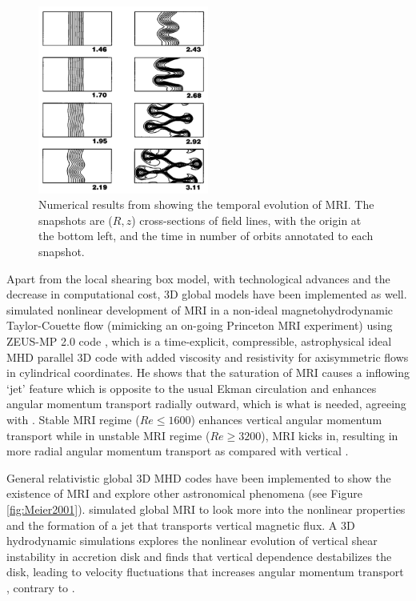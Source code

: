 \documentclass{jfm}
\begin{document}
\begin{figure}
    \centering
    \includegraphics[width=0.50\textwidth]{Balbus1998}
    \caption{Numerical results from \cite{Balbus1998} showing the temporal evolution of MRI. The snapshots are ($R, z$) cross-sections of field lines, with the origin at the bottom left, and the time in number of orbits annotated to each snapshot.}
    \label{fig:Balbus1998}
\end{figure}

Apart from the local shearing box model, with technological advances and the
decrease in computational cost, 3D global models have been implemented as well.
\cite{Liu2008} simulated nonlinear development of MRI in a non-ideal
magnetohydrodynamic Taylor-Couette flow (mimicking an on-going Princeton MRI
experiment) using ZEUS-MP 2.0 code \citep{Hayes2006}, which is a time-explicit,
compressible, astrophysical ideal MHD parallel 3D code with added viscosity and
resistivity for axisymmetric flows in cylindrical coordinates. He shows that
the saturation of MRI causes a inflowing `jet' feature which is opposite to the
usual Ekman circulation and enhances angular momentum transport radially
outward, which is what is needed, agreeing with \cite{Hawley1995}. Stable MRI
regime ($ Re \le 1600$) enhances vertical angular momentum transport while in
unstable MRI regime ($Re \ge 3200$), MRI kicks in, resulting in more radial
angular momentum transport as compared with vertical \citep{Liu2008}.

General relativistic global 3D MHD codes have been implemented to show the
existence of MRI and explore other astronomical phenomena 
\citep{Meier2001, Villiers2003, Koide2000} (see Figure \ref{fig:Meier2001}).
\cite{Kersale2006} simulated global MRI to look more into the nonlinear
properties and the formation of a jet that transports vertical magnetic flux. A
3D hydrodynamic simulations explores the nonlinear evolution of vertical shear
instability in accretion disk and finds that vertical dependence destabilizes
the disk, leading to velocity fluctuations that increases angular momentum
transport \citep{Arlt2004}, contrary to \cite{Hawley1995}.
\end{document}
